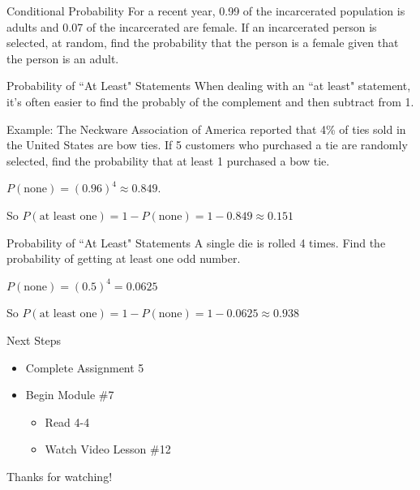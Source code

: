 \documentclass[t, aspectratio=169]{beamer}
\newcommand{\?}{\stackrel{?}{=}}
\begin{document}
	\begin{frame}{Conditional Probability}
		For a recent year, 0.99 of the incarcerated population is adults and 0.07 of the incarcerated are female. If an incarcerated person is selected, at random, find the probability that the person is a female given that the person is an adult.
		\begin{flalign*}
		\end{flalign*}
	\end{frame}

	\begin{frame}{Probability of ``At Least" Statements}
		When dealing with an ``at least" statement, it's often easier to find the probably of the complement and then subtract from 1.
		
		Example: The Neckware Association of America reported that 4\% of ties sold in the United States are bow ties. If 5 customers who purchased a tie are randomly selected, find the probability that at least 1 purchased a bow tie. \pause
		
		$P(\text{none}) = (0.96)^4 \approx 0.849$. \pause
		
		So $P(\text{at least one}) = 1 - P(\text{none}) = 1 - 0.849 \approx 0.151$
	\end{frame}
	
	\begin{frame}{Probability of ``At Least" Statements}
		A single die is rolled 4 times. Find the probability of getting at least one odd number. \pause
		
		$P(\text{none}) = (0.5)^4 = 0.0625$ \pause
		
		So $P(\text{at least one}) = 1 - P(\text{none}) = 1 - 0.0625 \approx 0.938$
	\end{frame}

	\begin{frame}{Next Steps}
		\begin{itemize}
			\item Complete Assignment 5
			\item Begin Module \#7 \begin{itemize}
				\item Read 4-4
				\item Watch Video Lesson \#12
			\end{itemize}
		\end{itemize}
	
		\vfill
		
		Thanks for watching!
	\end{frame}
\end{document}
